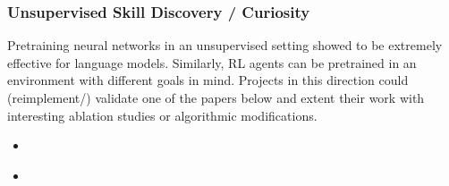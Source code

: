 \documentclass[a4paper]{article}
\begin{document}
%

\subsubsection{Unsupervised Skill Discovery / Curiosity}
Pretraining neural networks in an unsupervised setting showed to be extremely effective for language models. Similarly, RL agents can be pretrained in an environment with different goals in mind. Projects in this direction could (reimplement/) validate one of the papers below and extent their work with interesting ablation studies or algorithmic modifications.
\begin{itemize}
  \item \cite{Plan2Explore2020}
  \item \cite{DADS2020}
\end{itemize}

\end{document}

